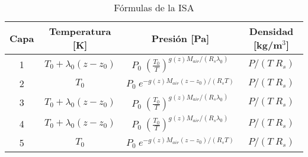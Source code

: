 
\begin{table}[ht]
\centering

\begin{tabular}{cccc}
\hline
\textbf{Capa} & \textbf{Temperatura [K]} & \textbf{Presión [Pa]} & \textbf{Densidad [kg/m$^3$]} \\
\hline
1 & $T_0 + \lambda_0 (z - z_0)$ & $P_0 \; \left( \frac{T_0}{T} \right)^{g(z) M_{air} / (R_{s} \lambda_0)}$ & $ P / (T \; R_{s})$ \\
2 & $T_0$ & $P_0 \; e^{-g(z) M_{air} (z - z_0) / (R_{s} T)}$ & $ P / (T \; R_{s})$ \\
3 & $T_0 + \lambda_0 (z - z_0)$ & $P_0 \; \left( \frac{T_0}{T} \right)^{g(z) M_{air} / (R_{s} \lambda_0)}$ & $ P / (T \; R_{s})$ \\
4 & $T_0 + \lambda_0 (z - z_0)$ & $P_0 \; \left( \frac{T_0}{T} \right)^{g(z) M_{air} / (R_{s} \lambda_0)}$ & $ P / (T \; R_{s})$ \\
5 & $T_0$ & $P_0 \; e^{-g(z) M_{air} (z - z_0) / (R_{s} T)}$ & $ P / (T \; R_{s})$ \\
\hline
\end{tabular}
\caption{Fórmulas de la ISA}
\label{tab:formulas_ISA}
\end{table}
